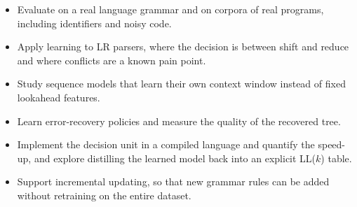 \documentclass[12pt,a4paper]{article}
\begin{document}
\begin{itemize}
    \item Evaluate on a real language grammar and on corpora of real programs,
    including identifiers and noisy code.
    \item Apply learning to LR parsers, where the decision is between shift and
    reduce and where conflicts are a known pain point.
    \item Study sequence models that learn their own context window instead of
    fixed lookahead features.
    \item Learn error-recovery policies and measure the quality of the
    recovered tree.
    \item Implement the decision unit in a compiled language and quantify the
    speed-up, and explore distilling the learned model back into an explicit
    LL($k$) table.
    \item Support incremental updating, so that new grammar rules can be added
    without retraining on the entire dataset.
\end{itemize}
\end{document}

